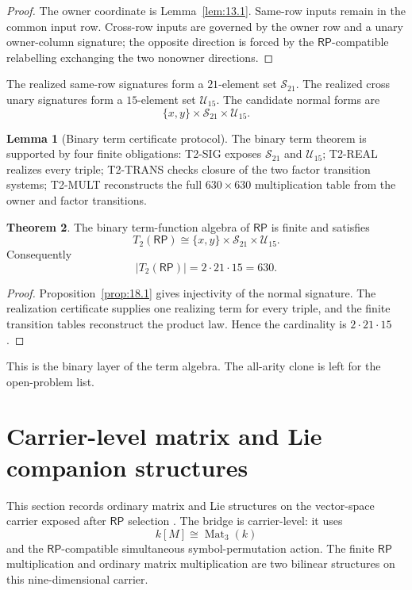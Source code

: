 \documentclass[11pt]{article}
\theoremstyle{definition}
\newtheorem{theorem}{Theorem}[section]
\newtheorem{lemma}[theorem]{Lemma}
\newcommand{\RP}{\mathsf{RP}}
\begin{document}
\begin{proof}
The owner coordinate is Lemma~\ref{lem:13.1}.  Same-row inputs remain in
the common input row.  Cross-row inputs are governed by the owner row and a
unary owner-column signature; the opposite direction is forced by the
\(\RP\)-compatible relabelling exchanging the two nonowner directions.
\end{proof}

The realized same-row signatures form a \(21\)-element set
\(\mathcal S_{21}\).  The realized cross unary signatures form a
\(15\)-element set \(\mathcal U_{15}\).  The candidate normal forms are
\[
\{x,y\}\times\mathcal S_{21}\times\mathcal U_{15}.
\]

\begin{lemma}[Binary term certificate protocol]
\label{lem:18.2}
The binary term theorem is supported by four finite obligations:
T2-SIG exposes \(\mathcal S_{21}\) and \(\mathcal U_{15}\); T2-REAL
realizes every triple; T2-TRANS checks closure of the two factor transition
systems; T2-MULT reconstructs the full \(630\times630\) multiplication
table from the owner and factor transitions.
\end{lemma}

\begin{theorem}
\label{thm:18.3}
The binary term-function algebra of \(\RP\) is finite and satisfies
\[
T_2(\RP)
\cong
\{x,y\}\times\mathcal S_{21}\times\mathcal U_{15}.
\]
Consequently
\[
|T_2(\RP)|=2\cdot21\cdot15=630.
\]
\end{theorem}

\begin{proof}
Proposition~\ref{prop:18.1} gives injectivity of the normal signature.
The realization certificate supplies one realizing term for every triple,
and the finite transition tables reconstruct the product law.  Hence the
cardinality is \(2\cdot21\cdot15\).
\end{proof}

This is the binary layer of the term algebra.  The all-arity clone is left
for the open-problem list.

\section{Carrier-level matrix and Lie companion structures}\label{carrier-level-companion-lie-package}

This section records ordinary matrix and Lie structures on the vector-space
carrier exposed after \(\RP\) selection
\cite{HornJohnson2012,FultonHarris1991,Hall2015}.  The bridge is
carrier-level: it uses
\[
k[M]\cong\operatorname{Mat}_3(k)
\]
and the \(\RP\)-compatible simultaneous symbol-permutation action.  The finite
\(\RP\) multiplication and ordinary matrix multiplication are two bilinear
structures on this nine-dimensional carrier.
\end{document}

